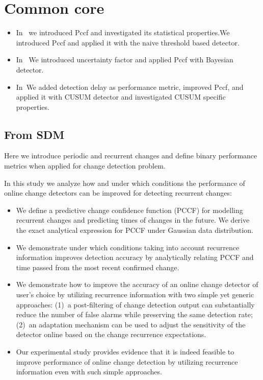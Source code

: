 \chapter{Common core}
    
\begin{itemize}
  \item In~\cite{MaslovSDM2016} we introduced Pccf and investigated its statistical properties.We introduced Pccf and applied it with the naive threshold based detector.
  \item In~\cite{MaslovIJCNN2017} We introduced uncertainty factor and applied Pccf with Bayesian detector.
  \item In~\cite{Maslov2021}We added detection delay as performance metric, improved Pccf, and applied it with CUSUM detector and investigated CUSUM specific properties.
\end{itemize}

\section{From SDM}

Here we introduce periodic and recurrent changes and define binary performance metrics when applied for change detection problem.

In this study we analyze how and under which conditions the performance of online change detectors can be improved for detecting recurrent changes:
\begin{itemize}	\setlength\itemsep{0pt}
    \item We define a predictive change confidence function (PCCF) for modelling recurrent changes and predicting times of changes in the future. We derive the exact analytical expression for PCCF under Gaussian data distribution.
    \item We demonstrate under which conditions taking into account recurrence information improves detection accuracy by analytically relating PCCF and time passed from the most recent confirmed change.

    \item We demonstrate how to improve the accuracy of an online change detector of user's choice by utilizing recurrence information with two simple yet generic approaches: (1)~a post-filtering of change detection output can substantially reduce the number of false alarms while preserving the same detection rate; (2)~an adaptation mechanism can be used to adjust the sensitivity of the detector online based on the change recurrence expectations.

    \item Our experimental study provides evidence that it is indeed feasible to improve performance of online change detection by utilizing recurrence information even with such simple approaches.
\end{itemize}

